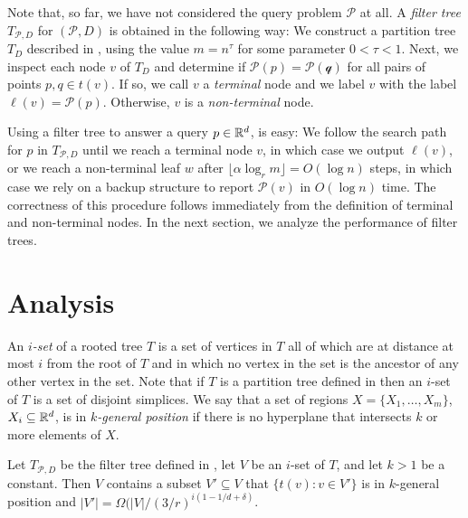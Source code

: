 \documentclass{patmorin}
\begin{document}
Note that, so far, we have not considered the query problem $\mathcal{P}$
at all. A \emph{filter tree} $T_{\mathcal{P},D}$ for $(\mathcal{P},D)$
is obtained in the following way:  We construct a partition tree $T_D$
described in , using the value $m=n^{\tau}$
for some parameter $0 < \tau < 1$.  Next, we inspect each node $v$ of
$T_D$ and determine if $\mathcal{P}(p)=\mathcal{P(q)}$ for all pairs
of points $p,q\in t(v)$. If so, we call $v$ a \emph{terminal} node and
we label $v$ with the label $\ell(v) = \mathcal{P}(p)$.  Otherwise, $v$
is a \emph{non-terminal} node.

Using a filter tree to answer a query $p\in \mathbb{R}^d$, is easy: We follow
the search path for $p$ in $T_{\mathcal{P},D}$ until we reach a terminal
node $v$, in which case we output $\ell(v)$, or we reach a non-terminal
leaf $w$ after $\lfloor \alpha\log_r m\rfloor=O(\log n)$ steps, in which
case we rely on a backup structure to report $\mathcal{P}(v)$ in $O(\log
n)$ time.  The correctness of this procedure follows immediately from
the definition of terminal and non-terminal nodes.  In the next section,
we analyze the performance of filter trees.



\section{Analysis}

An \emph{$i$-set} of a rooted tree $T$ is a set of vertices in $T$ all
of which are at distance at most $i$ from the root of $T$ and in which
no vertex in the set is the ancestor of any other vertex in the set.
Note that if $T$ is a partition tree defined in 
then an $i$-set of $T$ is a set of disjoint simplices.  We say that
a set of regions $X=\{X_1,\ldots,X_m\}$, $X_i\subseteq\mathbb{R}^d$, is in
\emph{$k$-general position} if there is no hyperplane that intersects $k$
or more elements of $X$.

\begin{lem}
  Let $T_{\mathcal{P},D}$ be the filter tree defined in
  , let $V$ be an $i$-set of $T$, and let
  $k>1$ be a constant.  Then $V$ contains a subset $V'\subseteq
  V$ that $\{t(v): v\in V'\}$ is in $k$-general position and
  $|V'|=\Omega(|V|/(3/r)^{i(1-1/d+\delta)}$.
\end{lem}
\end{document}
